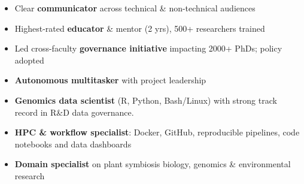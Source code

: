 \documentclass[a4paper,10pt]{article}
\begin{document}
{\begin{adjustbox}{valign=t}
\begin{minipage}[t]{0.3\textwidth}
{
\begin{spacing}{1}
\begin{itemize}
  \setlength{\itemindent}{-1em}
  \setlength{\itemsep}{0.0em}
  \item Clear \textbf{communicator} across technical \& non-technical audiences
  \item Highest-rated \textbf{educator} \& mentor (2 yrs), 500+ researchers trained
  \item Led cross-faculty \textbf{governance initiative} impacting 2000+ PhDs; policy adopted
  \item \textbf{Autonomous multitasker} with project leadership
  \item \textbf{Genomics data scientist} (R, Python, Bash/Linux) with strong track record in R\&D data governance.
  \item \textbf{HPC \& workflow specialist}: Docker, GitHub, reproducible pipelines, code notebooks and data dashboards
  \item \textbf{Domain specialist} on plant symbiosis biology, genomics \& environmental research
\end{itemize}
\end{spacing}
}




\end{minipage}%
\end{adjustbox}%
\hfill%


\begin{adjustbox}{valign=t}
\hfill%
\begin{minipage}[t]{0.05\textwidth}
\MyVerticalRule
\end{minipage}%
\end{adjustbox}

\begin{adjustbox}{valign=t}
\hfill%
\begin{minipage}[t]{0.6\textwidth}


\end{minipage}
\end{adjustbox}}
\end{document}

